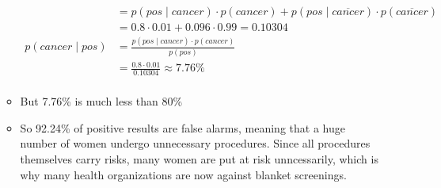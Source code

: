\documentclass[11pt,letterpaper]{article}
\begin{document}
\begin{itemize}
\begin{itemize}
\begin{align*}
             &=p(pos \mid cancer) \cdot p(cancer) + p(pos \mid \overline{cancer}) \cdot p(\overline{cancer}) \\
             &= 0.8 \cdot 0.01 + 0.096 \cdot 0.99 = 0.10304 \\
      p(cancer \mid pos) &= \frac{p(pos \mid cancer) \cdot p(cancer)}{p(pos)} \\
                         &= \frac{0.8 \cdot 0.01}{0.10304} \approx 7.76\% \\
    \end{align*}
    \item But 7.76\% is much less than 80\%
    \item So 92.24\% of positive results are false alarms, meaning that a huge number of women undergo unnecessary procedures.  Since all procedures themselves carry risks, many women are put at risk unncessarily, which is why many health organizations are now against blanket screenings.
  \end{itemize}

\end{itemize}
\end{document}
